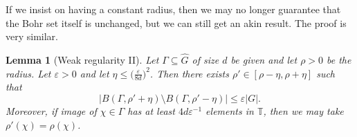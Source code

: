 \documentclass[a4paper,11pt]{article}
\numberwithin{theorem}{section}
\newtheorem{lemma}[theorem]{Lemma}
\theoremstyle{definition}
\begin{document}
If we insist on having a constant radius, then we may no longer guarantee that the Bohr set itself is unchanged, but we can still get an akin result. The proof is very similar.

\begin{lemma}[Weak regularity II]\label{bohrwreg2}
    Let $\Gamma \subseteq \hat{G}$ of size $d$ be given and let $\rho> 0$ be the radius. Let $\varepsilon > 0$ and let $\eta \leq \Big(\frac{\varepsilon}{8d}\Big)^2$. Then there exists $\rho' \in [\rho - \eta, \rho + \eta]$ such that
    \[|B(\Gamma, \rho' + \eta) \setminus B(\Gamma, \rho' - \eta)| \leq \varepsilon |G|.\]
    \indent Moreover, if image of $\chi \in \Gamma$ has at least $4d \varepsilon^{-1}$ elements in $\mathbb{T}$, then we may take $\rho'(\chi) = \rho(\chi)$.
\end{lemma}
\end{document}
